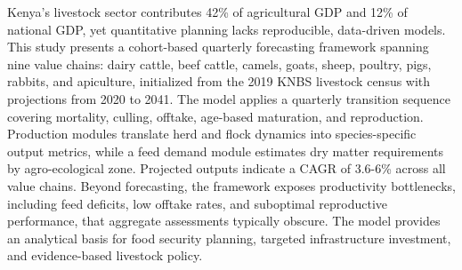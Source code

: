 
Kenya's livestock sector contributes 42\% of agricultural GDP and 12\% of national GDP, yet quantitative planning lacks reproducible, data-driven models. This study presents a cohort-based quarterly forecasting framework spanning nine value chains: dairy cattle, beef cattle, camels, goats, sheep, poultry, pigs, rabbits, and apiculture, initialized from the 2019 KNBS livestock census with projections from 2020 to 2041. The model applies a quarterly transition sequence covering mortality, culling, offtake, age-based maturation, and reproduction. Production modules translate herd and flock dynamics into species-specific output metrics, while a feed demand module estimates dry matter requirements by agro-ecological zone. Projected outputs indicate a CAGR of 3.6-6\% across all value chains. Beyond forecasting, the framework exposes productivity bottlenecks, including feed deficits, low offtake rates, and suboptimal reproductive performance, that aggregate assessments typically obscure. The model provides an analytical basis for food security planning, targeted infrastructure investment, and evidence-based livestock policy.